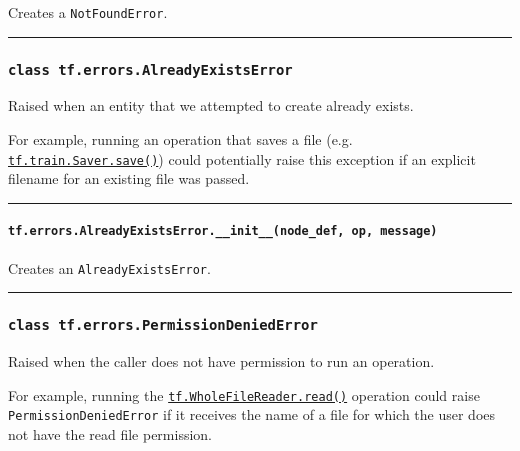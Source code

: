Creates a \texttt{NotFoundError}.

\begin{center}\rule{0.5\linewidth}{\linethickness}\end{center}

\subsubsection{\texorpdfstring{\texttt{class\ tf.errors.AlreadyExistsError}
}{class tf.errors.AlreadyExistsError }}\label{class-tf.errors.alreadyexistserror}

Raised when an entity that we attempted to create already exists.

For example, running an operation that saves a file (e.g.
\href{../../api_docs/python/train.md\#Saver.save}{\texttt{tf.train.Saver.save()}})
could potentially raise this exception if an explicit filename for an
existing file was passed.

\begin{center}\rule{0.5\linewidth}{\linethickness}\end{center}

\paragraph{\texorpdfstring{\texttt{tf.errors.AlreadyExistsError.\_\_init\_\_(node\_def,\ op,\ message)}
}{tf.errors.AlreadyExistsError.\_\_init\_\_(node\_def, op, message) }}\label{tf.errors.alreadyexistserror.ux5fux5finitux5fux5fnodeux5fdef-op-message}

Creates an \texttt{AlreadyExistsError}.

\begin{center}\rule{0.5\linewidth}{\linethickness}\end{center}

\subsubsection{\texorpdfstring{\texttt{class\ tf.errors.PermissionDeniedError}
}{class tf.errors.PermissionDeniedError }}\label{class-tf.errors.permissiondeniederror}

Raised when the caller does not have permission to run an operation.

For example, running the
\href{../../api_docs/python/io_ops.md\#WholeFileReader}{\texttt{tf.WholeFileReader.read()}}
operation could raise \texttt{PermissionDeniedError} if it receives the
name of a file for which the user does not have the read file
permission.

